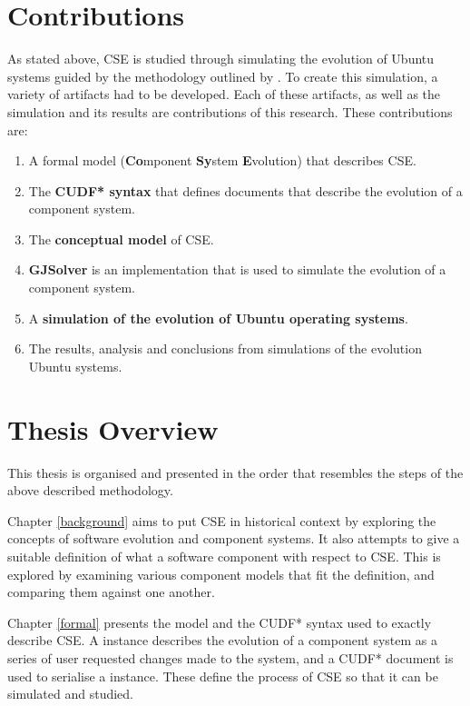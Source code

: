 \section{Contributions}
As stated above, CSE is studied through simulating the evolution of Ubuntu systems guided by the methodology outlined by \cite{Law2005}.
To create this simulation, a variety of artifacts had to be developed.
Each of these artifacts, as well as the simulation and its results are contributions of this research. 
These contributions are:
\begin{enumerate}
  \item A formal model \textbf{\modelname} (\textbf{Co}mponent \textbf{Sy}stem \textbf{E}volution) that describes CSE. 
  \item The \textbf{CUDF* syntax} that defines documents that describe the evolution of a component system.
  \item The \textbf{conceptual model} of CSE.
  \item \textbf{GJSolver} is an implementation that is used to simulate the evolution of a component system.
  \item A \textbf{simulation of the evolution of Ubuntu operating systems}.
  \item The results, analysis and conclusions from simulations of the evolution Ubuntu systems.
\end{enumerate}

\section{Thesis Overview}
This thesis is organised and presented in the order that resembles the steps of the above described methodology. 

Chapter \ref{background} aims to put CSE in historical context by exploring the concepts of software evolution and component systems.
It also attempts to give a suitable definition of what a software component with respect to CSE.
This is explored by examining various component models that fit the definition, and comparing them against one another.

Chapter \ref{formal} presents the \modelname model and the CUDF* syntax used to exactly describe CSE.
A \modelname instance describes the evolution of a component system as a series of user requested changes made to the system,
and a CUDF* document is used to serialise a \modelname instance.
These define the process of CSE so that it can be simulated and studied.

